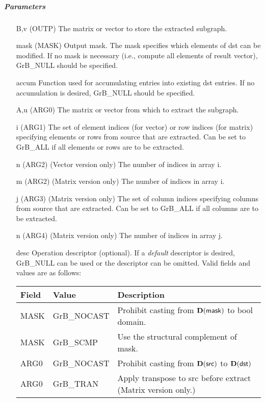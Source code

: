 \subparagraph{Parameters}

\begin{itemize}[leftmargin=1in]
    \item[{\sf B,v}]   ({\sf OUTP}) The matrix or vector to store the extracted subgraph.

    \item[{\sf mask}] ({\sf MASK}) Output mask. The mask
    specifies which elements of {\sf dst} can be modified.
    If no mask is necessary (i.e., compute all elements of result
    vector), {\sf GrB\_NULL} should be specified.

    \item[{\sf accum}]  Function used for accumulating entries into existing {\sf dst} entries. 
			If no accumulation is desired, {\sf GrB\_NULL} should be specified.

    \item[{\sf A,u}]   ({\sf ARG0}) The matrix or vector from which to extract the subgraph.
    \item[{\sf i}]     ({\sf ARG1}) The set of element indices (for vector) or row indices (for matrix) specifying elements or rows from source that
                              are extracted. Can
                              be set to {\sf GrB\_ALL} if all elements or rows are
                              to be extracted.
    \item[{\sf n}]     ({\sf ARG2}) (Vector version only) The number of indices in array {\sf i}.
    \item[{\sf m}]     ({\sf ARG2}) (Matrix version only) The number of indices in array {\sf i}.
    \item[{\sf j}]     ({\sf ARG3}) (Matrix version only) The set of column indices specifying
                              columns from source that are extracted. Can
                              be set to {\sf GrB\_ALL} if all columns are
                              to be extracted.
    \item[{\sf n}]     ({\sf ARG4}) (Matrix version only) The number of indices in array {\sf j}.

    \item[{\sf desc}]   Operation descriptor (optional). If a
    \emph{default} descriptor is desired, {\sf GrB\_NULL} can be
    used or the descriptor can be omitted.  Valid fields and values are as follows: \\
    \begin{tabular}{lll}
    Field  & Value & Description \\
    \hline
    {\sf MASK} & {\sf GrB\_NOCAST} & Prohibit casting from $\bold{D}({\sf mask})$ to {\sf bool} domain. \\
    {\sf MASK} & {\sf GrB\_SCMP}   & Use the structural complement of {\sf mask}. \\
    {\sf ARG0} & {\sf GrB\_NOCAST} & Prohibit casting from $\bold{D}({\sf src})$ to $\bold{D}({\sf dst})$ \\
    {\sf ARG0} & {\sf GrB\_TRAN}   & Apply transpose to {\sf src} before extract (Matrix version only.) \\
    \end{tabular}
\end{itemize}

